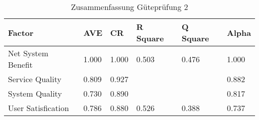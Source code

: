 \begin{table}[h] 
\caption{Zusammenfassung G\"utepr\"ufung 2}
\label{tab:Zusammenfassung} 
\begin{tabular}{@{}llllll@{}} \toprule

\textbf{Factor} & \textbf{AVE} & \textbf{CR} & \textbf{R Square} & \textbf{Q Square} & \textbf{Alpha} \\ \midrule

 Net System Benefit & 1.000 & 1.000 & 0.503 & 0.476 & 1.000 \\
 
 Service Quality & 0.809 & 0.927 & & & 0.882 \\

 System Quality & 0.730 & 0.890 & & & 0.817 \\

 User Satisfication & 0.786 & 0.880 & 0.526 & 0.388 & 0.737 \\ \bottomrule
\end{tabular}	
\end{table}